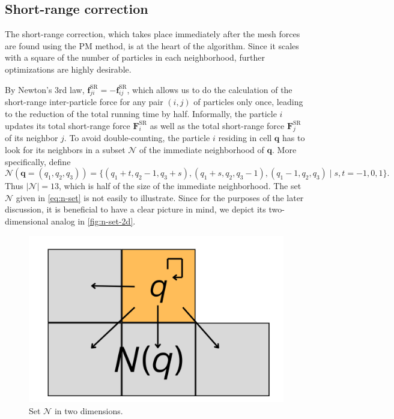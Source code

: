 \subsection{Short-range correction}
The short-range correction, which takes place immediately after the mesh forces are found using the PM method, is at the heart of the \PThreeM{} algorithm.
Since it scales with a square of the number of particles in each neighborhood, further optimizations are highly desirable.

By Newton's 3rd law, $\mathbf{f}^\text{SR}_{ji} = -\mathbf{f}^\text{SR}_{ij}$, which allows us to do the calculation of the short-range inter-particle force for any pair $(i, j)$ of particles only once, leading to the reduction of the total running time by half.
Informally, the particle $i$ updates its total short-range force $\mathbf{F}^\text{SR}_i$ as well as the total short-range force $\mathbf{F}^\text{SR}_j$ of its neighbor $j$.
To avoid double-counting, the particle $i$ residing in cell $\mathbf{q}$ has to look for its neighbors in a subset $\mathcal{N}$ of the immediate neighborhood of $\mathbf{q}$.
More specifically, define
\begin{equation}\label{eq:n-set}
    \mathcal{N}(\mathbf{q} = (q_1, q_2, q_3)) = \{(q_1+t, q_2-1,q_3+s), (q_1+s, q_2, q_3-1), (q_1-1,q_2,q_3) \;|\; s,t = -1,0,1 \}.
\end{equation}
Thus $|\mathcal{N}| = 13$, which is half of the size of the immediate neighborhood.
The set $\mathcal{N}$ given in \autoref{eq:n-set} is not easily to illustrate.
Since for the purposes of the later discussion, it is beneficial to have a clear picture in mind, we depict its two-dimensional analog in \autoref{fig:n-set-2d}.
\begin{figure}[htp]
    \centering
    \includegraphics[scale=0.12]{img/q-neighborhood.png}
    \caption{Set $\mathcal{N}$ in two dimensions.}
    \label{fig:n-set-2d}
\end{figure}


